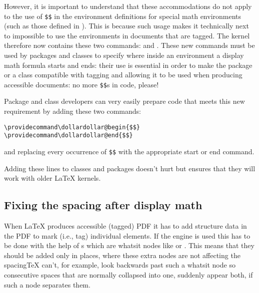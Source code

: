 \documentclass{ltnews}
\providecommand\Dash {\unskip \textemdash}
\providecommand\pdfTeX{\hologo{pdfTeX}}
\begin{document}
However, it is important to understand that these accommodations do not apply 
to the use of \verb=$$= in the environment definitions for special
math environments (such as those defined in ). 
This is because such usage makes it
technically next to %
impossible to use the environments in documents that are tagged.
%
The kernel therefore now contains these two commands:
 and .  These new commands
must be used by packages and classes to specify where
inside an environment
a display math
formula starts and ends: their use is essential in order to make the
package or a class compatible with tagging and allowing it to be used
when producing accessible documents: no more \texttt{\$\$}s
in code, please! 

Package and class developers can very easily prepare code that 
meets this new requirement by adding these two commands:
\begin{verbatim}
\providecommand\dollardollar@begin{$$}
\providecommand\dollardollar@end{$$}
\end{verbatim}
and replacing every occurrence of \verb=$$= with the appropriate start or
end command.

Adding these  lines to
classes and packages doesn't hurt but ensures that they will work with older \LaTeX{}
kernels.




\subsection{Fixing the spacing after display math}

When \LaTeX{} produces accessible (tagged) PDF 
it has to add
structure data in the PDF to mark (i.e., tag) individual
elements. If the \pdfTeX{} engine is used this has to be done with the
help of s which are whatsit nodes like  or
. This means that they should be added only in places, where
these extra nodes are not affecting the spacing\Dash \TeX{} can't, for
example, look backwards past such a whatsit node so consecutive spaces
that are normally collapsed into one, suddenly appear both, if such a
node separates them.
\end{document}
